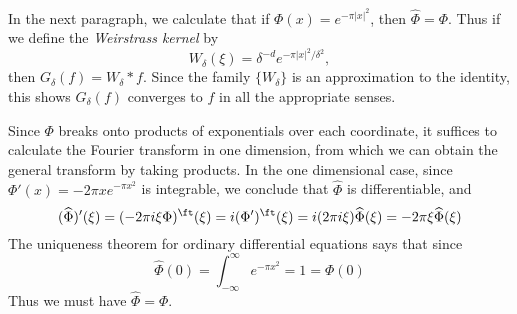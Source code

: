 \begin{example}
	In the next paragraph, we calculate that if $\Phi(x) = e^{-\pi |x|^2}$, then $\widehat{\Phi} = \Phi$. Thus if we define the \emph{Weirstrass kernel} by
	\[ W_\delta(\xi) = \delta^{-d} e^{-\pi |x|^2/\delta^2}, \]
	then $G_\delta(f) = W_\delta * f$. Since the family $\{ W_\delta \}$ is an approximation to the identity, this shows $G_\delta(f)$ converges to $f$ in all the appropriate senses.

	Since $\Phi$ breaks onto products of exponentials over each coordinate, it suffices to calculate the Fourier transform in one dimension, from which we can obtain the general transform by taking products. In the one dimensional case, since $\Phi'(x) = -2 \pi x e^{- \pi x^2}$ is integrable, we conclude that $\widehat{\Phi}$ is differentiable, and
	\[ (\widehat{\Phi})'(\xi) = (- 2 \pi i \xi \Phi)^\ft(\xi) = i (\Phi')^\ft(\xi) = i (2 \pi i \xi) \widehat{\Phi}(\xi) = - 2 \pi \xi \widehat{\Phi}(\xi) \]
	The uniqueness theorem for ordinary differential equations says that since
	\[ \widehat{\Phi}(0) = \int_{-\infty}^\infty e^{- \pi x^2} = 1 = \Phi(0) \]
	Thus we must have $\widehat{\Phi} = \Phi$.
\end{example}

